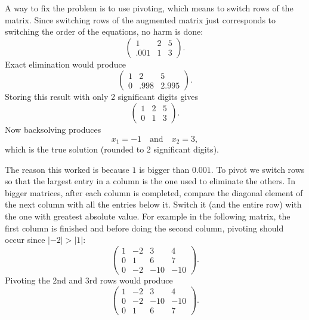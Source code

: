 A way to fix the problem is to use pivoting, which means to switch rows of
the matrix. Since switching rows of the augmented matrix
just corresponds to switching the order of the equations, no harm
is done:
\begin{equation*}
\left(\begin{array}{cc|c}
          1 &  2 & 5  \\
        .001 & 1 & 3
      \end{array}\right).
\end{equation*}
Exact elimination would produce
\begin{equation*}
\left(\begin{array}{cc|c}
          1 &  2 & 5  \\
          0 & .998 & 2.995
      \end{array}\right).
\end{equation*}
Storing this result with only 2 significant digits gives
\begin{equation*}
\left(\begin{array}{cc|c}
          1 &  2 & 5  \\
          0 & 1 & 3
      \end{array}\right).
\end{equation*}
Now backsolving produces
$$
      x_1 = -1 \quad\text{and}\quad x_2 = 3,
$$
which is the true solution (rounded to 2 significant digits).

The reason this worked is because $1$ is bigger than $0.001$. To pivot
we switch rows so that the largest entry in a column is the one used
to eliminate the others. In bigger matrices, after each column is completed,
compare the diagonal element of the next column with all the entries below
it. Switch it (and the entire row) with the one with greatest absolute value.
For example in the following matrix, the first column is finished and before
doing the second column, pivoting should occur since $|-2|>|1|$:
$$
\left(\begin{array}{ccc|c}
        1 & -2 & 3 & 4 \\
        0 &  1 & 6 & 7 \\
        0 & -2 & -10 & -10
      \end{array}\right).
$$
Pivoting the 2nd and 3rd rows would produce
$$
\left(\begin{array}{ccc|c}
        1 & -2 & 3 & 4 \\
        0 & -2 & -10 & -10\\
        0 &  1 & 6 & 7
      \end{array}\right).
$$

